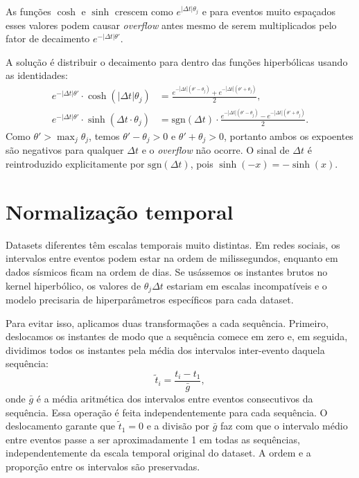As funções $\cosh$ e $\sinh$ crescem como $e^{|\Delta t|\theta_j}$ e para eventos muito espaçados esses valores podem causar \textit{overflow} antes mesmo de serem multiplicados pelo fator de decaimento $e^{-|\Delta t|\theta'}$.

A solução é distribuir o decaimento para dentro das funções hiperbólicas usando as identidades:
%
\begin{align}
    e^{-|\Delta t|\theta'} \cdot \cosh(|\Delta t|\theta_j)
    &= \frac{e^{-|\Delta t|(\theta' - \theta_j)} + e^{-|\Delta t|(\theta' + \theta_j)}}{2},
    \label{eq:decay-cosh}\\[4pt]
    e^{-|\Delta t|\theta'} \cdot \sinh(\Delta t \cdot \theta_j)
    &= \mathrm{sgn}(\Delta t) \cdot \frac{e^{-|\Delta t|(\theta' - \theta_j)} - e^{-|\Delta t|(\theta' + \theta_j)}}{2}.
    \label{eq:decay-sinh}
\end{align}
%
Como $\theta' > \max_j \theta_j$, temos $\theta' - \theta_j > 0$ e $\theta' + \theta_j > 0$, portanto ambos os expoentes são negativos para qualquer $\Delta t$ e o \textit{overflow} não ocorre. O sinal de $\Delta t$ é reintroduzido explicitamente por $\mathrm{sgn}(\Delta t)$, pois $\sinh(-x) = -\sinh(x)$.

\section{Normalização temporal}
\label{sec:normalizacao-temporal}

Datasets diferentes têm escalas temporais muito distintas. Em redes sociais, os intervalos entre eventos podem estar na ordem de milissegundos, enquanto em dados sísmicos ficam na ordem de dias. Se usássemos os instantes brutos no kernel hiperbólico, os valores de $\theta_j \Delta t$ estariam em escalas incompatíveis e o modelo precisaria de hiperparâmetros específicos para cada dataset.

Para evitar isso, aplicamos duas transformações a cada sequência. Primeiro, deslocamos os instantes de modo que a sequência comece em zero e, em seguida, dividimos todos os instantes pela média dos intervalos inter-evento daquela sequência:
%
\begin{equation}
    \tilde{t}_i = \frac{t_i - t_1}{\bar{g}},
    \label{eq:normalizacao-temporal}
\end{equation}
%
onde $\bar{g}$ é a média aritmética dos intervalos entre eventos consecutivos da sequência. Essa operação é feita independentemente para cada sequência. O deslocamento garante que $\tilde{t}_1 = 0$ e a divisão por $\bar{g}$ faz com que o intervalo médio entre eventos passe a ser aproximadamente 1 em todas as sequências, independentemente da escala temporal original do dataset. A ordem e a proporção entre os intervalos são preservadas.

